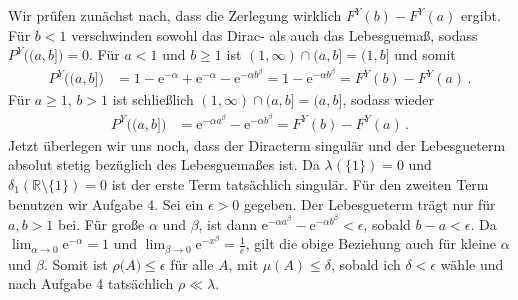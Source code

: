 \documentclass{article}
\begin{document}
Wir prüfen zunächst nach, dass die Zerlegung wirklich $F^Y(b)-F^Y(a)$ ergibt.
Für $b<1$ verschwinden sowohl das Dirac- als auch das Lebesguemaß, sodass $P^Y\bigl((a,b]\bigr)=0$.
Für $a<1$ und $b\geq1$ ist $(1,\infty)\cap(a,b]=(1,b]$ und somit
\begin{align*}
  P^Y\bigl((a,b]\bigr)
  &=1-\mathrm{e}^{-\alpha}+\mathrm{e}^{-\alpha}-\mathrm{e}^{-\alpha b^\beta}=1-\mathrm{e}^{-\alpha b^\beta}=F^Y(b)-F^Y(a)\,.
\end{align*}
Für $a\geq1$, $b>1$ ist schließlich $(1,\infty)\cap(a,b]=(a,b]$, sodass wieder
\begin{align*}
  P^Y\bigl((a,b]\bigr)
  &=\mathrm{e}^{-\alpha a^\beta}-\mathrm{e}^{-\alpha b^\beta}=F^Y(b)-F^Y(a)\,.
\end{align*}
Jetzt überlegen wir uns noch, dass der Diracterm singulär und der Lebesgueterm absolut stetig bezüglich des Lebesguemaßes ist.
Da $\lambda(\{1\})=0$ und $\delta_1(\mathbb{R}\setminus\{1\})=0$ ist der erste Term tatsächlich singulär.
Für den zweiten Term benutzen wir Aufgabe 4.
Sei ein $\epsilon>0$ gegeben.
Der Lebesgueterm trägt nur für $a,b>1$ bei.
Für große $\alpha$ und $\beta$, ist dann $\mathrm{e}^{-\alpha a^\beta}-\mathrm{e}^{-\alpha b^\beta}<\epsilon$, sobald $b-a<\epsilon$.
Da $\lim_{\alpha\to0}\mathrm{e}^{-\alpha}=1$ und $\lim_{\beta\to 0}\mathrm{e}^{-x^\beta}=\frac{1}{e}$, gilt die obige Beziehung auch für kleine $\alpha$ und $\beta$. Somit ist $\rho\bigl(A\bigr)\leq\epsilon$ für alle $A$, mit $\mu(A)\leq \delta$, sobald ich $\delta<\epsilon$ wähle und nach Aufgabe 4 tatsächlich $\rho\ll\lambda$.
\end{document}
